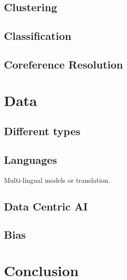 \subsection{Clustering}
\subsection{Classification}
\subsection{Coreference Resolution}


\section{Data}
\subsection{Different types}
\subsection{Languages} Multi-lingual models or translation.
\subsection{Data Centric AI}
\subsection{Bias}

\section{Conclusion}